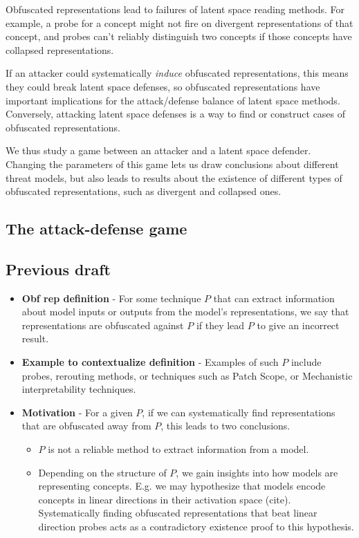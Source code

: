 \documentclass{article}
\begin{document}
Obfuscated representations lead to failures of latent space reading methods. For example, a probe for a concept might not fire on divergent representations of that concept, and probes can't reliably distinguish two concepts if those concepts have collapsed representations.

If an attacker could systematically \emph{induce} obfuscated representations, this means they could break latent space defenses, so obfuscated representations have important implications for the attack/defense balance of latent space methods. Conversely, attacking latent space defenses is a way to find or construct cases of obfuscated representations.

We thus study a game between an attacker and a latent space defender. Changing the parameters of this game lets us draw conclusions about different threat models, but also leads to results about the existence of different types of obfuscated representations, such as divergent and collapsed ones.

\subsection{The attack-defense game}

\subsection{Previous draft}




\begin{itemize}[noitemsep]
     \item \textbf{Obf rep definition} - For some technique $P$ that can extract information about model inputs or outputs from the model’s representations, we say that representations are obfuscated against $P$ if they lead $P$ to give an incorrect result.
     \item \textbf{Example to contextualize definition} -
     Examples of such $P$ include probes, rerouting methods, or 
     techniques such as Patch Scope, or Mechanistic 
     interpretability techniques.
     \item \textbf{Motivation} - 
     For a given $P$, if we can systematically find
     representations that are obfuscated away from $P$, this 
     leads to two conclusions.
     \begin{itemize}[noitemsep]
         \item $P$ is not a reliable method to extract
         information from a model. 
         \item Depending on the structure of $P$, we 
         gain insights into how models are representing
         concepts. E.g. we may hypothesize that models 
         encode concepts in linear directions in their
         activation space (cite). Systematically 
         finding obfuscated representations that 
         beat linear direction probes acts as a
         contradictory existence proof to this hypothesis.
     \end{itemize}
\end{itemize}
\end{document}
